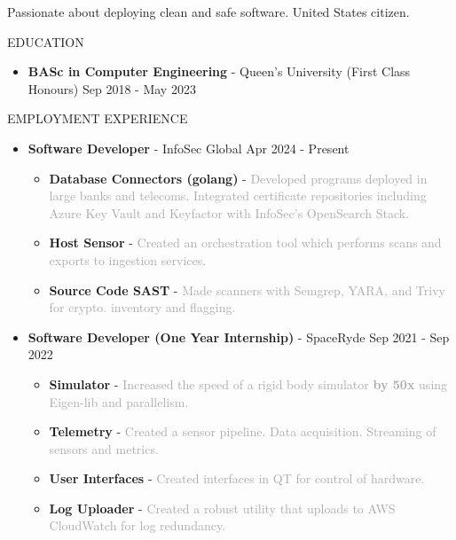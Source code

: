\documentclass{resume} %
\begin{document}
Passionate about deploying clean and safe software. United States citizen.

\begin{rSection}{EDUCATION}
    \begin{itemize}
        \item {\bf BASc in Computer Engineering} - Queen's University (First Class Honours) \hfill {Sep 2018 - May 2023}
    \end{itemize}
\end{rSection}

\begin{rSection}{EMPLOYMENT EXPERIENCE}
    \begin{itemize}
        \item {\bf Software Developer} - InfoSec Global \hfill {Apr 2024 - Present}
        \begin{itemize}[topsep=-8pt]
            \setlength\itemsep{-0.3em}
                \item[\textbullet] {\bf Database Connectors (golang)} - \textcolor{darkgray}{Developed programs deployed in large banks and telecoms. Integrated
                certificate repositories including Azure Key Vault and Keyfactor with InfoSec’s OpenSearch Stack.}
                \item[\textbullet] {\bf Host Sensor} - \textcolor{darkgray}{Created an orchestration tool which performs scans and exports to ingestion services.}
                \item[\textbullet] {\bf Source Code SAST} - \textcolor{darkgray}{Made scanners with Semgrep, YARA, and Trivy for crypto. inventory and flagging.}
            \end{itemize}
        \item {\bf Software Developer (One Year Internship)} - SpaceRyde \hfill {Sep 2021 - Sep 2022}
        \begin{itemize}[topsep=-8pt]
            \setlength\itemsep{-0.3em}
            \item[\textbullet] {\bf Simulator} - \textcolor{darkgray}{Increased the speed of a rigid body simulator \textbf{by 50x} using Eigen-lib and parallelism.}
            \item[\textbullet] {\bf Telemetry} - \textcolor{darkgray}{Created a sensor pipeline. Data acquisition. Streaming of sensors and metrics.}
            \item[\textbullet] {\bf User Interfaces} - \textcolor{darkgray}{Created interfaces in QT for control of hardware.}
            \item[\textbullet] {\bf Log Uploader} - \textcolor{darkgray}{Created a robust utility that uploads to AWS CloudWatch for log redundancy.}

\end{itemize}
\end{itemize}
\end{rSection}
\end{document}
